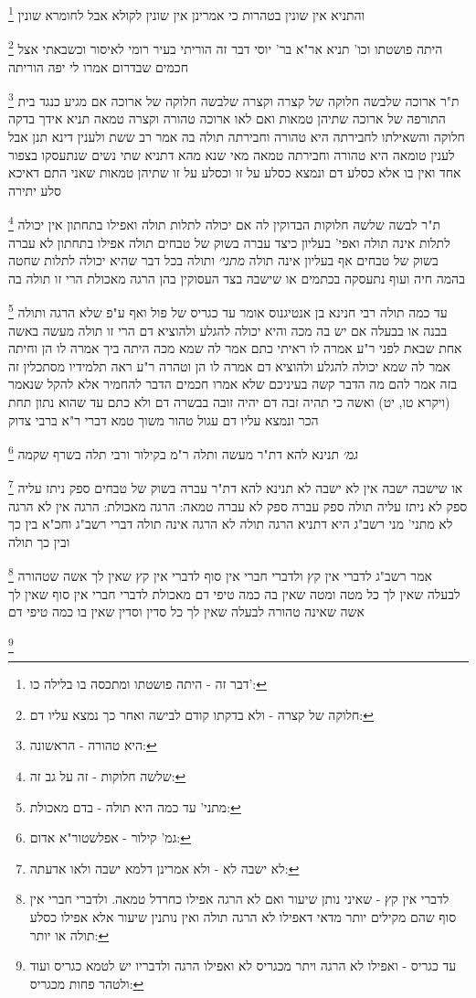 \documentclass[12pt, openany]{book}
\newcommand{\footnotecomment}[1]{
	\renewcommand\thefootnote{}
	\footnote{#1}}
\newcommand{\commenta}[1]{\footnotecomment{#1}}
\begin{document}
{{\commenta{דבר זה - היתה פושטתו ומתכסה בו בלילה כו':}
והתניא אין שונין בטהרות כי אמרינן אין שונין לקולא אבל לחומרא שונין
\commenta{חלוקה של קצרה - ולא בדקתו קודם לבישה ואחר כך נמצא עליו דם:}
היתה פושטתו וכו' תניא אר"א בר' יוסי דבר זה הוריתי בעיר רומי לאיסור וכשבאתי אצל חכמים שבדרום אמרו לי יפה הוריתה 
\commenta{היא טהורה - הראשונה:}
ת"ר ארוכה שלבשה חלוקה של קצרה וקצרה שלבשה חלוקה של ארוכה אם מגיע כנגד בית התורפה של ארוכה שתיהן טמאות ואם לאו ארוכה טהורה וקצרה טמאה 
תניא אידך בדקה חלוקה והשאילתו לחבירתה היא טהורה וחבירתה תולה בה אמר רב ששת ולענין דינא תנן אבל לענין טומאה היא טהורה וחבירתה טמאה
מאי שנא מהא דתניא שתי נשים שנתעסקו בצפור אחד ואין בו אלא כסלע דם ונמצא כסלע על זו וכסלע על זו שתיהן טמאות שאני התם דאיכא סלע יתירה 
\commenta{שלשה חלוקות - זה על גב זה:}
ת"ר לבשה שלשה חלוקות הבדוקין לה אם יכולה לתלות תולה ואפילו בתחתון אין יכולה לתלות אינה תולה ואפי' בעליון 
כיצד עברה בשוק של טבחים תולה אפילו בתחתון לא עברה בשוק של טבחים אף בעליון אינה תולה
{\large\emph{מתני׳}} ותולה בכל דבר שהיא יכולה לתלות שחטה בהמה חיה ועוף נתעסקה בכתמים או שישבה בצד העסוקין בהן הרגה מאכולת הרי זו תולה בה 
\commenta{מתני' עד כמה היא תולה - בדם מאכולת:}
עד כמה תולה רבי חנינא בן אנטיגנוס אומר עד כגריס של פול ואף ע"פ שלא הרגה ותולה בבנה או בבעלה אם יש בה מכה והיא יכולה להגלע ולהוציא דם הרי זו תולה 
מעשה באשה אחת שבאת לפני ר"ע אמרה לו ראיתי כתם אמר לה שמא מכה היתה ביך אמרה לו הן וחיתה אמר לה שמא יכולה להגלע ולהוציא דם אמרה לו הן וטהרה ר"ע 
ראה תלמידיו מסתכלין זה בזה אמר להם מה הדבר קשה בעיניכם שלא אמרו חכמים הדבר להחמיר אלא להקל שנאמר (ויקרא טו, יט) ואשה כי תהיה זבה דם יהיה זובה בבשרה דם ולא כתם 
עד שהוא נתון תחת הכר ונמצא עליו דם עגול טהור משוך טמא דברי ר"א ברבי צדוק
\commenta{גמ' קילור - אפלשטור"א אדום:}
{\large\emph{גמ׳}} תנינא להא דת"ר מעשה ותלה ר"מ בקילור ורבי תלה בשרף שקמה
\commenta{לא ישבה לא - ולא אמרינן דלמא ישבה ולאו אדעתה:}
או שישבה ישבה אין לא ישבה לא 
תנינא להא דת"ר עברה בשוק של טבחים ספק ניתז עליה ספק לא ניתז עליה תולה ספק עברה ספק לא עברה טמאה:
הרגה מאכולת: הרגה אין לא הרגה לא מתני' מני רשב"ג היא דתניא הרגה תולה לא הרגה אינה תולה דברי רשב"ג וחכ"א בין כך ובין כך תולה 
\commenta{לדברי אין קץ - שאיני נותן שיעור ואם לא הרגה אפילו כחרדל טמאה. ולדברי חברי אין סוף שהם מקילים יותר מדאי דאפילו לא הרגה תולה ואין נותנין שיעור אלא אפילו כסלע תולה או יותר:}
אמר רשב"ג לדברי אין קץ ולדברי חברי אין סוף 
לדברי אין קץ שאין לך אשה שטהורה לבעלה שאין לך כל מטה ומטה שאין בה כמה טיפי דם מאכולת 
לדברי חברי אין סוף שאין לך אשה שאינה טהורה לבעלה שאין לך כל סדין וסדין שאין בו כמה טיפי דם 
\commenta{עד כגריס - ואפילו לא הרגה ויתר מכגריס לא ואפילו הרגה ולדבריו יש לטמא כגריס ועוד ולטהר פחות מכגריס:}
}}
\end{document}
